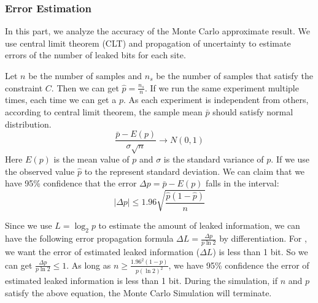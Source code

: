 \subsubsection{Error Estimation}
In this part, we analyze the accuracy of the Monte Carlo approximate
result. We use central limit theorem (CLT) and propagation of uncertainty 
to estimate errors of the number of leaked bits for each site.

Let $n$ be the number of samples and $n_s$ be the number of samples
that satisfy the constraint $C$. Then we can get $\hat{p} = \frac{n_s}{n}$.
If we run the same experiment multiple times, each time we can
get a $p$. 
As each experiment is independent from others, according to 
central limit theorem, the sample mean $\bar{p}$ should 
satisfy normal distribution.
$$ \frac{\bar{p}-E(p)}{\sigma\sqrt{n}} \rightarrow N(0,1) $$
Here $E(p)$ is the mean value of $p$ and $\sigma$ is the standard 
variance of $p$. If we use the observed value $\hat{p}$ 
to the represent standard deviation.
We can claim that we have 95\% confidence that the error 
$\Delta p= \bar{p} - E(p)$ falls in the interval:
$$ |\Delta p| \leq 1.96\sqrt{\frac{ \hat{p} (1- \hat{p} )}{n}}$$

Since we use $L = \log_{2}p$ to estimate the amount of leaked information,
we can have the following error propagation formula $\Delta L = \frac{\Delta p}{p\ln2}$
by differentiation. For \tool, we want the error of estimated leaked information ($\Delta L$) is 
less than 1 bit. So we can get $\frac{\Delta p}{p\ln2} \leq 1$. As long as
$ n \geq \frac{1.96^2(1-p)}{p(\ln2)^2}$, we have 95\% confidence the error of estimated 
leaked information is less than 1 bit. During the simulation, if $n$ and $p$ satisfy
the above equation, the Monte Carlo Simulation will terminate.



